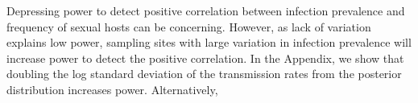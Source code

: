 \documentclass{article}\usepackage[]{graphicx}\usepackage[]{color}
\begin{document}
Depressing power to detect positive correlation between infection prevalence and frequency of sexual hosts can be concerning.
However, as lack of variation explains low power, sampling sites with large variation in infection prevalence will increase power to detect the positive correlation.
In the Appendix, we show that doubling the log standard deviation of the transmission rates from the posterior distribution increases power. %
Alternatively, %



\end{document}
